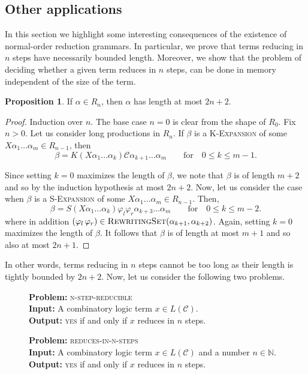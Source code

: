 \documentclass[11pt,a4paper]{amsart}
\theoremstyle{definition}
\newtheorem{prop}[theorem]{Proposition}
\newcommand{\RewritingSet}[2]{\textsc{RewritingSet}(#1,#2)}
\begin{document}
\subsection{Other applications}\label{sec:applications}
In this section we highlight some interesting consequences of the existence of normal-order reduction grammars. In particular, we prove that terms reducing in $n$ steps have necessarily bounded length.  Moreover, we show that the problem of deciding whether a given term reduces in $n$ steps, can be done in memory independent of the size of the term.

\begin{prop}\label{prop-LRn-production-length}
If $\alpha \in R_n$, then $\alpha$ has length at most $2n + 2$.
\end{prop}

\begin{proof}
    Induction over $n$. The base case $n = 0$ is clear from the shape of $R_0$.
    Fix $n > 0$. Let us consider long productions in $R_n$. If $\beta$ is a
    \textsc{K-Expansion} of some $X \alpha_1 \ldots \alpha_m \in R_{n-1}$, then
    \[ \beta = K(X \alpha_1 \ldots \alpha_k) \mathcal{C} \alpha_{k+1} \ldots
    \alpha_m \qquad \text{for} \quad 0 \leq k \leq m-1. \]
   
    Since setting $k = 0$ maximizes the length of $\beta$, we note that $\beta$
    is of length $m + 2$ and so by the induction hypothesis at most $2n + 2$.
    Now, let us consider the case when $\beta$ is a \textsc{S-Expansion} of some
    $X \alpha_1 \ldots \alpha_m \in R_{n-1}$. Then,
    \[ \beta = S(X \alpha_1 \ldots \alpha_k) \varphi_l \varphi_r \alpha_{k+3}
    \ldots \alpha_m \qquad \text{for} \quad 0 \leq k \leq m -2. \]
    where in addition $(\varphi_l\, \varphi_r) \in \RewritingSet{\alpha_{k+1}}{\alpha_{k+2}}$.
    Again, setting $k = 0$ maximizes the length of $\beta$. It follows that
    $\beta$ is of length at most $m + 1$ and so also at most $2n + 1$.
\end{proof}

In other words, terms reducing in $n$ steps cannot be too long as their length is tightly bounded by $2n + 2$. Now, let us consider the following two problems.

\begin{figure}[H]
\flushleft
\noindent \textbf{Problem:} \textsc{n-step-reducible}\\
\textbf{Input:} A combinatory logic term $x \in L(\mathcal{C})$.\\
\textbf{Output:} \textsc{yes} if and only if $x$ reduces in $n$ steps.
\end{figure}
\begin{figure}[H]
\flushleft
\noindent \textbf{Problem:} \textsc{reduces-in-n-steps}\\
\textbf{Input:} A combinatory logic term $x \in L(\mathcal{C})$ and a number $n
        \in \mathbb{N}$.\\
\textbf{Output:} \textsc{yes} if and only if $x$ reduces in $n$ steps.
\end{figure}
\end{document}
